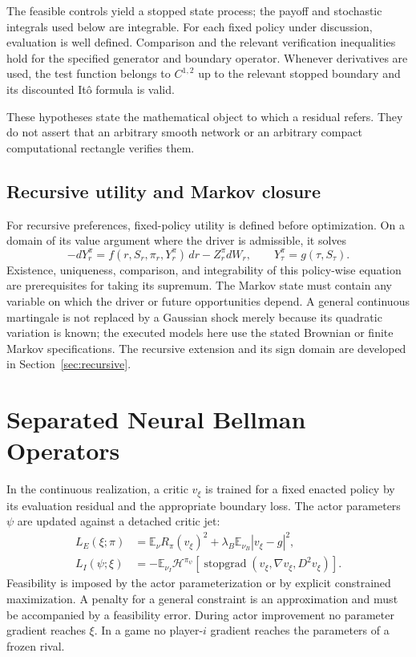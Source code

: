 \begin{assumption}\label{ass:verify}
The feasible controls yield a stopped state process; the payoff and stochastic integrals used below are integrable. For each fixed policy under discussion, evaluation is well defined. Comparison and the relevant verification inequalities hold for the specified generator and boundary operator. Whenever derivatives are used, the test function belongs to $C^{1,2}$ up to the relevant stopped boundary and its discounted It\^o formula is valid.
\end{assumption}
These hypotheses state the mathematical object to which a residual refers. They do not assert that an arbitrary smooth network or an arbitrary compact computational rectangle verifies them.

\subsection{Recursive utility and Markov closure}
For recursive preferences, fixed-policy utility is defined before optimization. On a domain of its value argument where the driver is admissible, it solves
\begin{equation}
-dY_r^\pi=f(r,S_r,\pi_r,Y_r^\pi)\,dr-Z_r^\pi dW_r,
\qquad Y_\tau^\pi=g(\tau,S_\tau).
\label{eq:bsde}
\end{equation}
Existence, uniqueness, comparison, and integrability of this policy-wise equation are prerequisites for taking its supremum. The Markov state must contain any variable on which the driver or future opportunities depend. A general continuous martingale is not replaced by a Gaussian shock merely because its quadratic variation is known; the executed models here use the stated Brownian or finite Markov specifications. The recursive extension and its sign domain are developed in Section~\ref{sec:recursive}.

\section{Separated Neural Bellman Operators}
\label{sec:method}
In the continuous realization, a critic $v_\xi$ is trained for a fixed enacted policy by its evaluation residual and the appropriate boundary loss. The actor parameters $\psi$ are updated against a detached critic jet:
\begin{align}
L_E(\xi;\pi)&=\mathbb E_\nu R_\pi(v_\xi)^2+\lambda_B\mathbb E_{\nu_B}|v_\xi-g|^2,\label{eq:critic}\\
L_I(\psi;\xi)&=-\mathbb E_{\nu_I}\mathcal H^{\pi_\psi}[\operatorname{stopgrad}(v_\xi,\nabla v_\xi,D^2v_\xi)].\label{eq:actor}
\end{align}
Feasibility is imposed by the actor parameterization or by explicit constrained maximization. A penalty for a general constraint is an approximation and must be accompanied by a feasibility error. During actor improvement no parameter gradient reaches $\xi$. In a game no player-$i$ gradient reaches the parameters of a frozen rival.


